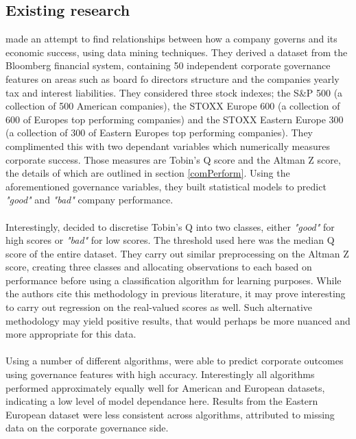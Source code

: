{\subsection{Existing research}
{\cite{moldovan2015learning} made an attempt to find relationships between how a company governs and its economic success, using data mining techniques. They derived a dataset from the Bloomberg financial system, containing 50 independent corporate governance features on areas such as board fo directors structure and the  companies yearly tax and interest liabilities. They considered three stock indexes; the S\&P 500 (a collection of 500 American companies), the STOXX Europe 600 (a collection of 600 of Europes top performing companies) and the STOXX Eastern Europe 300 (a collection of 300 of Eastern Europes top performing companies). They complimented this with two dependant variables which numerically measures corporate success. Those measures are Tobin's Q score and the Altman Z score, the details of which are outlined in section \ref{comPerform}. Using the aforementioned governance variables, they built statistical models to predict {\it "good"} and {\it "bad"} company performance.\\\\
Interestingly, \cite{moldovan2015learning} decided to discretise Tobin's Q into two classes, either {\it "good"} for high scores or {\it "bad"} for low scores. The threshold used here was the median Q score of the entire dataset. They carry out similar preprocessing on the Altman Z score, creating three classes and allocating observations to each based on performance before using a classification algorithm for learning purposes. While the authors cite this methodology in previous literature, it may prove interesting to carry out regression on the real-valued scores as well. Such alternative methodology may yield positive results, that would perhaps be more nuanced and more appropriate for this data. \\\\
Using a number of different algorithms, \cite{moldovan2015learning} were able to predict corporate outcomes using governance features with high accuracy. Interestingly all algorithms performed approximately equally well for American and European datasets, indicating a low level of model dependance here. Results from the Eastern European dataset were less consistent across algorithms, attributed to missing data on the corporate governance side.\\\\
}}
